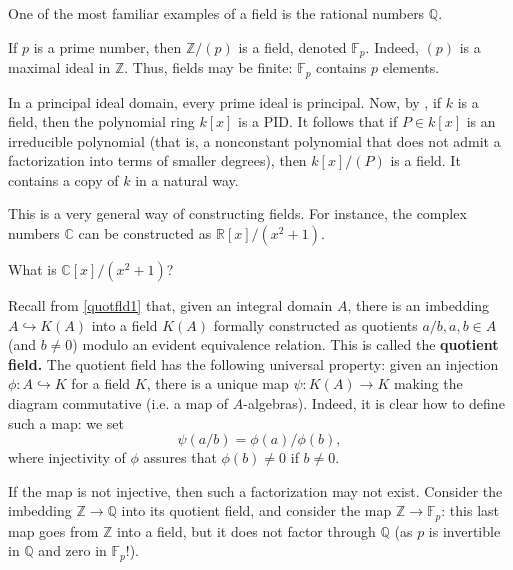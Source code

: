 \begin{example}
One of the most familiar examples of a field is the rational
numbers $\mathbb{Q}$.
\end{example}

\begin{example}
If $p$ is a prime number, then $\mathbb{Z}/(p)$ is a field, denoted
$\mathbb{F}_p$. Indeed, $(p)$ is a
maximal ideal in $\mathbb{Z}$. Thus, fields may be finite: $\mathbb{F}_p$
contains $p$ elements.  
\end{example}


\begin{example}
In a principal ideal domain, every prime ideal is principal. Now, by
, if $k$ is a field, then the polynomial ring $k[x]$ is a PID. 
It follows that if $P \in k[x]$ is an irreducible polynomial (that is, a
nonconstant polynomial
that does not admit a factorization into terms of smaller degrees), then
$k[x]/(P)$ is a field. It contains a copy of $k$ in a natural way.

This is a very general way of constructing fields. For instance, the
complex numbers $\mathbb{C}$
can be constructed as $\mathbb{R}[x]/(x^2 + 1)$.
\end{example} 



\begin{exercise} 
What is $\mathbb{C}[x]/(x^2 + 1)$?
\end{exercise} 

\begin{example}
Recall from \cref{quotfld1} that, given an integral domain $A$, there is an
imbedding $A \hookrightarrow K(A)$ into a field $K(A)$ formally constructed as
quotients $a/b, a, b \in A$ (and $b \neq 0$) modulo an evident equivalence
relation.
This is called the \textbf{quotient field.}
The quotient field has the following universal property: given an injection
$\phi: A
\hookrightarrow K$ for a field $K$, there is a unique map $\psi: K(A) \to K$ making
the diagram commutative (i.e. a map of $A$-algebras).
Indeed, it is clear how to define such a map: we set
\[ \psi(a/b) = \phi(a)/\phi(b),  \]
where injectivity of $\phi$ assures that $\phi(b) \neq 0$ if $ b \neq 0$.

If the map is not injective, then such a factorization may not exist. Consider
the imbedding $\mathbb{Z} \to \mathbb{Q}$ into its quotient field, and consider
the map $\mathbb{Z} \to \mathbb{F}_p$: this last map goes from $\mathbb{Z} $
into a field, but it does not factor through $\mathbb{Q}$ (as $p$ is invertible
in $\mathbb{Q}$ and zero in $\mathbb{F}_p$!).
\end{example} 



